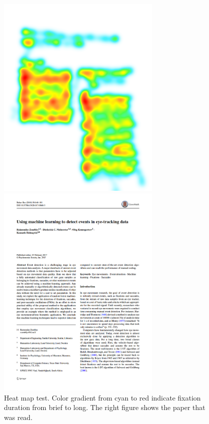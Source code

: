 \begin{figure}[h]
    \centering
    \begin{minipage}{0.5\textwidth}
        \centering
        \includegraphics[width=0.7\textwidth]{Images/DataQuality/PaperHeatmap.png}
    \end{minipage}\hfill
    \begin{minipage}{0.5\textwidth}
        \centering
        \includegraphics[width=0.7\textwidth]{Images/DataQuality/Paper.png}
    \end{minipage}
    \caption{Heat map test. Color gradient from cyan to red indicate fixation duration from brief to long. The right figure shows the paper that was read.}
    \label{fig:res_PaperHeatmap}
\end{figure}


